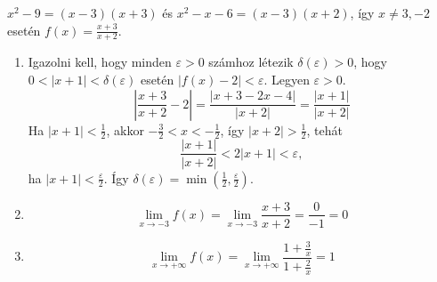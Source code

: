 \documentclass[11pt]{scrartcl}
\begin{document}
$x^2 - 9 = (x - 3)(x + 3)$ és $x^2 - x - 6 = (x - 3)(x + 2)$, így
$x \ne 3, -2$ esetén \(f(x) = \frac{x + 3}{x + 2}\).
\begin{enumerate}
	\item Igazolni kell, hogy minden $\varepsilon > 0$ számhoz létezik
	      $\delta(\varepsilon) > 0$, hogy $0 < |x + 1| < \delta(\varepsilon)$
	      esetén $|f(x) - 2| < \varepsilon$. Legyen $\varepsilon > 0$.
	      \[
		      \left| \frac{x + 3}{x + 2} - 2 \right|
		      = \frac{|x + 3 - 2x - 4|}{|x + 2|}
		      = \frac{|x + 1|}{|x + 2|}
	      \]
	      Ha $|x + 1| < \frac{1}{2}$, akkor $-\frac{3}{2} < x < -\frac{1}{2}$, így
	      $|x + 2| > \frac{1}{2}$, tehát
	      \[
		      \frac{|x + 1|}{|x + 2|} < 2 |x + 1| < \varepsilon,
	      \]
	      ha $|x + 1| < \frac{\varepsilon}{2}$. Így
	      \(
	      \delta(\varepsilon) = \min\left( \frac{1}{2}, \frac{\varepsilon}{2} \right)
	      \).

	\item \[
		      \lim_{x \to -3} f(x)
		      = \lim_{x \to -3} \frac{x + 3}{x + 2}
		      = \frac{0}{-1}
		      = 0
	      \]

	\item \[
		      \lim_{x \to +\infty} f(x)
		      = \lim_{x \to +\infty} \frac{1 + \frac{3}{x}}{1 + \frac{2}{x}}
		      = 1
	      \]
\end{enumerate}
\end{document}
